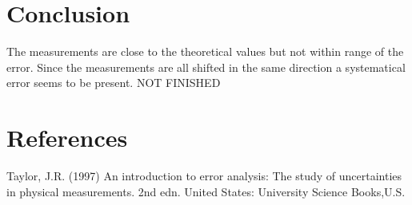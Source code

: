 \documentclass[../main/main.tex]{subfiles}
\begin{document}
\section{Conclusion}

The measurements are close to the theoretical values but not within range of the error.
Since the measurements are all shifted in the same direction a systematical error seems to be present.
NOT FINISHED

\section{References}

Taylor, J.R. (1997) An introduction to error analysis: The study of uncertainties in physical measurements. 2nd edn. United States: University Science Books,U.S.
\end{document}
